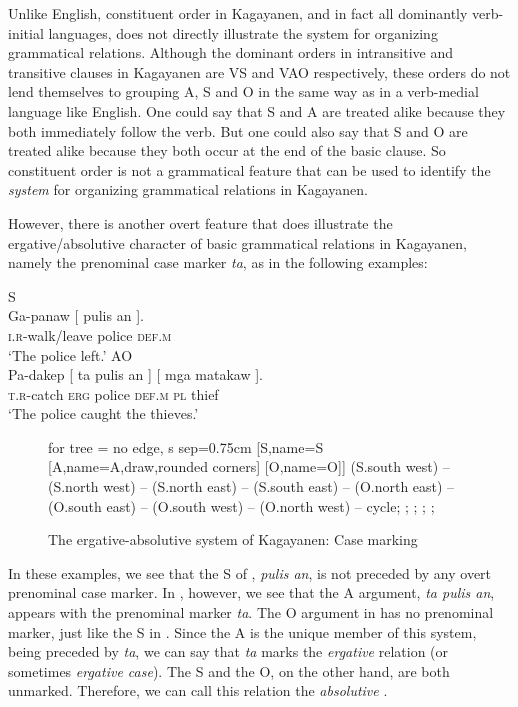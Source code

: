 Unlike English, constituent order in Kagayanen, and in fact all dominantly verb-initial languages, does not directly illustrate the system for organizing grammatical relations. Although the dominant orders in intransitive and transitive clauses in Kagayanen are VS and VAO respectively, these orders do not lend themselves to grouping A, S and O in the same way as in a verb-medial language like English. One could say that S and A are treated alike because they both immediately follow the verb. But one could also say that S and O are treated alike because they both occur at the end of the basic clause. So constituent order is not a grammatical feature that can be used to identify the \textit{system} for organizing grammatical relations in Kagayanen.

However, there is another overt feature that does illustrate the ergative/absolutive character of basic grammatical relations in Kagayanen, namely the prenominal case marker \textit{ta}, as in the following examples:

\ea 
	\ea 
        \label{ex:gapanawpulis}
	\hspace{3cm}S \\
	\gll Ga-panaw [ pulis an ]. \\
        \textsc{i.r}-walk/leave {} police \textsc{def.m} \\
	\glt ‘The police left.’
	\ex 
        \label{ex:padakeptapulismatakawan}
	\hspace{3cm}A\hspace{2cm}O \\
	\gll Pa-dakep [ ta pulis an ] [ mga matakaw ]. \\
        \textsc{t.r}-catch {} \textsc{erg} police \textsc{def.m} {} {} \textsc{pl} thief \\
        \glt ‘The police caught the thieves.’
	\z
\z
\begin{figure}
	\caption{The ergative-absolutive system of Kagayanen: Case marking}
	\begin{forest} for tree = {no edge, s sep=0.75cm}
	[S,name=S [A,name=A,draw,rounded corners] [O,name=O]]
	  (S.south west) -- (S.north west) -- (S.north east) -- (S.south east) -- (O.north east) -- (O.south east) -- (O.south west) -- (O.north west) -- cycle;
	;
	;
	;
	;
	\end{forest}
\end{figure}
In these examples, we see that the S of , \textit{pulis an}, is not preceded by any overt prenominal case marker. In , however, we see that the A argument, \textit{ta pulis an}, appears with the prenominal marker \textit{ta}. The O argument in  has no prenominal marker, just like the S in . Since the A is the unique member of this system, being preceded by \textit{ta}, we can say that \textit{ta} marks the \textit{ergative} relation (or sometimes \textit{ergative case}). The S and the O, on the other hand, are both unmarked. Therefore, we can call this relation the \textit{absolutive} \citep{silverstein1976, comrie1989, dixon1994}.

